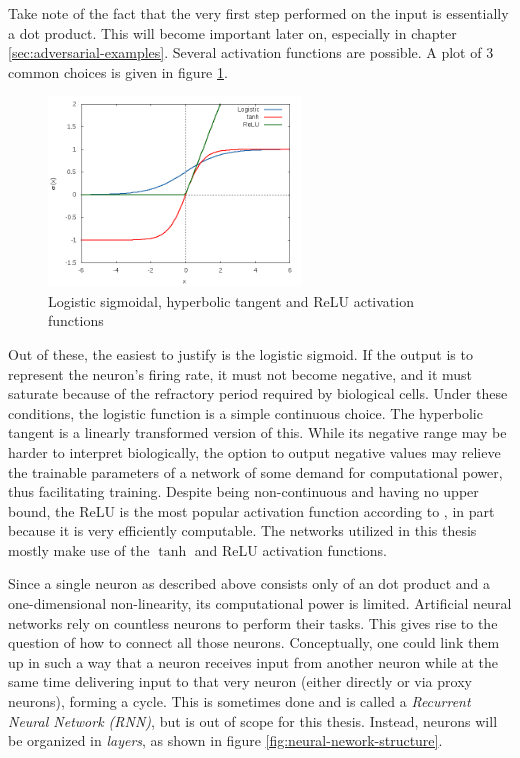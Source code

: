 \documentclass[11pt, a4paper]{article}
\begin{document}
Take note of the fact that the very first step performed on the input is essentially a dot product. This will become important later on, especially in chapter \ref{sec:adversarial-examples}. Several activation functions are possible. A plot of 3 common choices is given in figure \ref{fig:activation-functions}.

\begin{figure}[h!tb]
	\centering
	\includegraphics[width=0.6\textwidth]{images/activation_functions.png}
	\caption[Activation functions]{Logistic sigmoidal, hyperbolic tangent and ReLU activation functions}
	\label{fig:activation-functions}
\end{figure}

Out of these, the easiest to justify is the logistic sigmoid. If the output is to represent the neuron's firing rate, it must not become negative, and it must saturate because of the refractory period required by biological cells. Under these conditions, the logistic function is a simple continuous choice. The hyperbolic tangent is a linearly transformed version of this. While its negative range may be harder to interpret biologically, the option to output negative values may relieve the trainable parameters of a network of some demand for computational power, thus facilitating training. Despite being non-continuous and having no upper bound, the ReLU is the most popular activation function according to \cite{deep-learning}, in part because it is very efficiently computable. The networks utilized in this thesis mostly make use of the $\tanh$ and ReLU activation functions.

Since a single neuron as described above consists only of an dot product and a one-dimensional non-linearity, its computational power is limited. Artificial neural networks rely on countless neurons to perform their tasks. This gives rise to the question of how to connect all those neurons. Conceptually, one could link them up in such a way that a neuron receives input from another neuron while at the same time delivering input to that very neuron (either directly or via proxy neurons), forming a cycle. This is sometimes done and is called a \emph{Recurrent Neural Network (RNN)}, but is out of scope for this thesis. Instead, neurons will be organized in \emph{layers}, as shown in figure \ref{fig:neural-nework-structure}.
\end{document}
